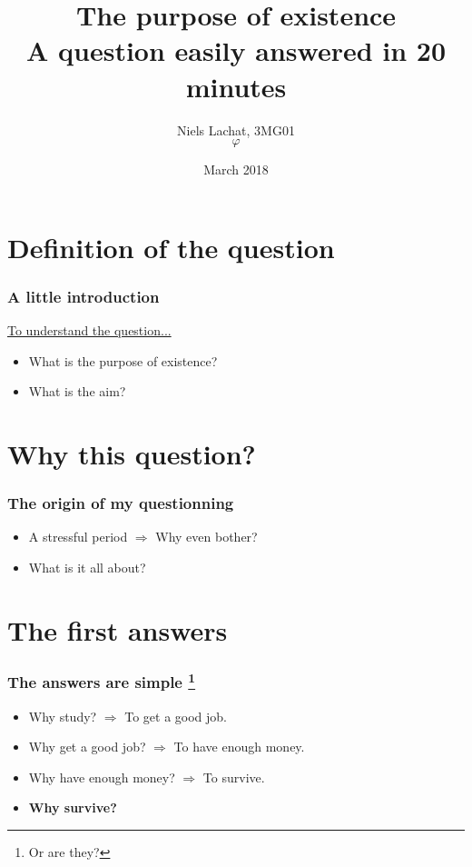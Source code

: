 \documentclass{beamer}
\title{The purpose of existence \\ A question easily answered in 20 minutes}
\author{Niels Lachat, 3MG01 \\ $\varphi$}
\date{March 2018}
\begin{document}
	\maketitle
	
	\tableofcontents
	
	\section{Definition of the question}
	
	\begin{frame}
		\frametitle{A little introduction}
		\href{../orig.gif}{To understand the question...} 
		
		\begin{itemize}
			\item What is the purpose of existence? 
			\item What is the aim?
		\end{itemize}
    \end{frame}
    
    
    \section{Why this question?}
    
    \begin{frame}
    		\frametitle{The origin of my questionning}
    		
    		\begin{itemize}
    			\item A stressful period
    			$\Rightarrow$ Why even bother? 
    			\item What is it all about?
    		\end{itemize}
    \end{frame}
    
    
    \section{The first answers}
    
    \begin{frame}
    		\frametitle{The answers are simple \footnote{Or are they?}}
    		
		\begin{itemize}
			\item Why study? $\Rightarrow$ To get a good job.
			\item Why get a good job? $\Rightarrow$ To have enough money.
			\item Why have enough money? $\Rightarrow$ To survive.
			\item \textbf{Why survive?}
		\end{itemize}		    		
    \end{frame}
    
\end{document}
